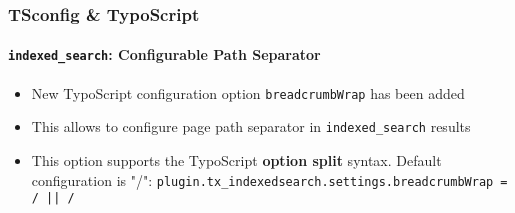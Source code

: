 \begin{frame}[fragile]
	\frametitle{TSconfig \& TypoScript}
	\framesubtitle{\texttt{indexed\_search}: Configurable Path Separator}

	\lstset{basicstyle=\tiny\ttfamily}

	\begin{itemize}

		\item New TypoScript configuration option \texttt{breadcrumbWrap} has been added

		\item This allows to configure page path separator in \texttt{indexed\_search} results

		\item This option supports the TypoScript \textbf{option split} syntax.\newline
			Default configuration is "/":\newline
			\small
				\texttt{plugin.tx\_indexedsearch.settings.breadcrumbWrap = / || /}
			\normalsize

	\end{itemize}

\end{frame}

